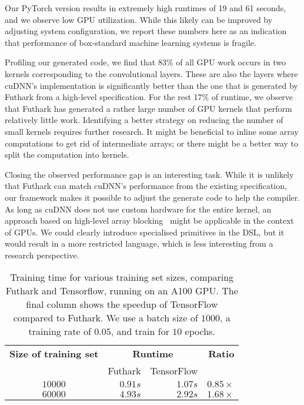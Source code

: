 Our PyTorch version results in extremely high runtimes of 19 and 61
seconds, and we observe low GPU utilization. While this likely can be
improved by adjusting system configuration, we report these numbers here
as an indication that performance of box-standard machine learning systems is
fragile.

Profiling our generated code, we find that 83\% of all GPU work occurs
in two kernels corresponding to the convolutional layers. These are also the layers
where cuDNN's implementation is significantly better than the one
that is generated by Futhark from a high-level specification.
For the rest 17\% of runtime, we observe that Futhark has
generated a rather large number of GPU kernels that perform relatively
little work.  Identifying a better strategy on reducing the number
of small kernels requires further research.  It might be beneficial to
inline some array computations to get rid of intermediate arrays;
or there might be a better way to split the computation into kernels.

Closing the observed performance gap is an interesting task.
While it is unlikely that Futhark can match cuDNN's performance
from the existing specification, our framework makes it possible
to adjust the generate code to help the compiler.  As long as cuDNN
does not use custom hardware for the entire kernel, an approach
based on high-level array blocking~\cite{rp-mm} might be applicable
in the context of GPUs.  We could clearly introduce specialised
primitives in the DSL, but it would result in a more
restricted language, which is less interesting from a research
perspective.

\begin{table}
\begin{tabular}{crrr}
\textbf{Size of training set} & \multicolumn{2}{c}{\textbf{Runtime}} & \textbf{Ratio} \\
& Futhark & TensorFlow & \\
$10000$ & $0.91s$ & $1.07s$ &  $0.85\times{}$ \\
$60000$ & $4.93s$ & $2.92s$ &  $1.68\times{}$
\end{tabular}
\caption{Training time for various training set sizes, comparing
  Futhark and Tensorflow, running on an A100 GPU. The final column
  shows the speedup of TensorFlow compared to Futhark. We use a batch
  size of $1000$, a training rate of $0.05$, and train for $10$
  epochs.}
\label{tab:performance}
\end{table}

%
